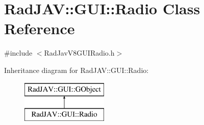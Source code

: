 \hypertarget{class_rad_j_a_v_1_1_g_u_i_1_1_radio}{}\section{Rad\+J\+AV\+:\+:G\+UI\+:\+:Radio Class Reference}
\label{class_rad_j_a_v_1_1_g_u_i_1_1_radio}


{\ttfamily \#include $<$Rad\+Jav\+V8\+G\+U\+I\+Radio.\+h$>$}

Inheritance diagram for Rad\+J\+AV\+:\+:G\+UI\+:\+:Radio\+:\begin{figure}[H]
\begin{center}
\leavevmode
\includegraphics[height=2.000000cm]{class_rad_j_a_v_1_1_g_u_i_1_1_radio}
\end{center}
\end{figure}
